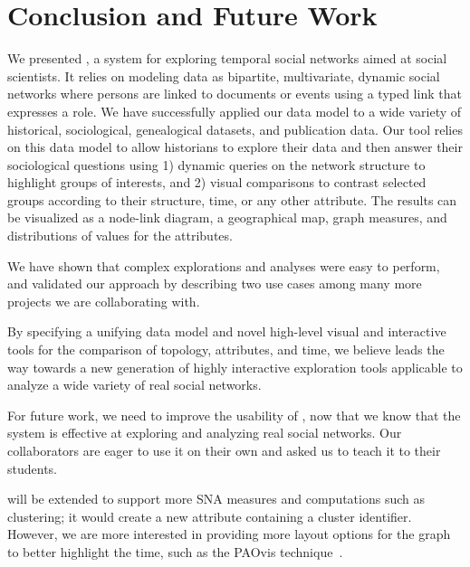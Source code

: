 


\section{Conclusion and Future Work}

We presented \name, a system for exploring temporal social networks aimed at social scientists. It relies on modeling data as bipartite, multivariate, dynamic social networks where persons are linked to documents or events using a typed link that expresses a role.
We have successfully applied our data model to a wide variety of historical, sociological, genealogical datasets, and publication data.
Our tool \name relies on this data model to allow historians to explore their data and then answer their sociological questions using 1) dynamic queries on the network structure to highlight groups of interests, and 2) visual comparisons to contrast selected groups according to their structure, time, or any other attribute.
The results can be visualized as a node-link diagram, a geographical map, graph measures, and distributions of values for the attributes.

We have shown that complex explorations and analyses were easy to perform, and validated our approach by describing two use cases among many more projects we are collaborating with.

By specifying a unifying data model and novel high-level visual and interactive tools for the comparison of topology, attributes, and time, we believe \name leads the way towards a new generation of highly interactive exploration tools applicable to analyze a wide variety of real social networks.

For future work, we need to improve the usability of \name, now that we know that the system is effective at exploring and analyzing real social networks. Our collaborators are eager to use it on their own and asked us to teach it to their students.

\name will be extended to support more SNA measures and computations such as clustering; it would create a new attribute containing a cluster identifier. However, we are more interested in providing more layout options for the graph to better highlight the time, such as the PAOvis technique~\cite{valdivia:hal-02264960}.
